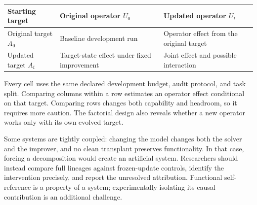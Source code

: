 \documentclass[11pt,american,]{article}
\begin{document}
\begin{longtable}[]{@{}lll@{}}
\toprule
\begin{minipage}[b]{0.30\columnwidth}\raggedright
Starting target\strut
\end{minipage} & \begin{minipage}[b]{0.30\columnwidth}\raggedright
Original operator \(U_0\)\strut
\end{minipage} & \begin{minipage}[b]{0.30\columnwidth}\raggedright
Updated operator \(U_t\)\strut
\end{minipage}\tabularnewline
\midrule
\endhead
\begin{minipage}[t]{0.30\columnwidth}\raggedright
Original target \(A_0\)\strut
\end{minipage} & \begin{minipage}[t]{0.30\columnwidth}\raggedright
Baseline development run\strut
\end{minipage} & \begin{minipage}[t]{0.30\columnwidth}\raggedright
Operator effect from the original target\strut
\end{minipage}\tabularnewline
\begin{minipage}[t]{0.30\columnwidth}\raggedright
Updated target \(A_t\)\strut
\end{minipage} & \begin{minipage}[t]{0.30\columnwidth}\raggedright
Target-state effect under fixed improvement\strut
\end{minipage} & \begin{minipage}[t]{0.30\columnwidth}\raggedright
Joint effect and possible interaction\strut
\end{minipage}\tabularnewline
\bottomrule
\end{longtable}

Every cell uses the same declared development budget, audit protocol,
and task split. Comparing columns within a row estimates an operator
effect conditional on that target. Comparing rows changes both
capability and headroom, so it requires more caution. The factorial
design also reveals whether a new operator works only with its own
evolved target.

Some systems are tightly coupled: changing the model changes both the
solver and the improver, and no clean transplant preserves
functionality. In that case, forcing a decomposition would create an
artificial system. Researchers should instead compare full lineages
against frozen-update controls, identify the intervention precisely, and
report the unresolved attribution. Functional self-reference is a
property of a system; experimentally isolating its causal contribution
is an additional challenge.
\end{document}
